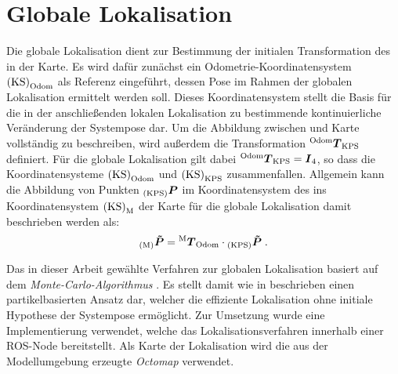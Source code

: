 
\section{Globale Lokalisation}
\label{chap.globloc}
Die globale Lokalisation dient zur Bestimmung der initialen Transformation des  in der Karte. Es wird dafür zunächst ein Odometrie-Koordinatensystem ${\mathrm{(KS)}}_{\mathrm{Odom}}$ als Referenz eingeführt, dessen Pose im Rahmen der globalen Lokalisation ermittelt werden soll. Dieses Koordinatensystem stellt die Basis für die in der anschließenden lokalen Lokalisation zu bestimmende kontinuierliche Veränderung der Systempose dar. Um die Abbildung zwischen \kps{} und Karte vollständig zu beschreiben, wird außerdem die Transformation ${^{\mathrm{Odom}}\mbox{\boldmath{$T$}}_{\mathrm{KPS}}}$ definiert. Für die globale Lokalisation gilt dabei ${^{\mathrm{Odom}}\mbox{\boldmath{$T$}}_{\mathrm{KPS}}} = \mbox{\boldmath{$I$}}_{\mathrm{4}}$, so dass die Koordinatensysteme ${\mathrm{(KS)}}_{\mathrm{Odom}}$ und ${\mathrm{(KS)}}_{\mathrm{KPS}}$ zusammenfallen. Allgemein kann die Abbildung von Punkten ${_{{\mathrm{(KPS)}}}}\mbox{\boldmath{$P$}}$ im Koordinatensystem des  ins Koordinatensystem ${\mathrm{(KS)}}_{\mathrm{M}}$ der Karte für die globale Lokalisation damit beschrieben werden als:
%
\begin{equation}
{_{{\mathrm{(M)}}}}\mbox{\boldmath{$\tilde{P}$}} = {^{\mathrm{M}}\mbox{\boldmath{$T$}}_{\mathrm{Odom}}} \cdot {_{{\mathrm{(KPS)}}}}\mbox{\boldmath{$\tilde{P}$}} \; \text{.}
\label{eq.globloc}
\end{equation}

\prever{
}

Das in dieser Arbeit gewählte Verfahren zur globalen Lokalisation basiert auf dem \textit{Monte-Carlo-Algorithmus} \cite{Dellaert1999}. Es stellt damit wie in  beschrieben einen partikelbasierten Ansatz dar, welcher die effiziente Lokalisation ohne initiale Hypothese der Systempose ermöglicht. Zur Umsetzung wurde eine Implementierung \cite{humanoidNavigation} verwendet, welche das Lokalisationsverfahren innerhalb einer ROS-Node bereitstellt. Als Karte der Lokalisation wird die aus der Modellumgebung erzeugte \textit{Octomap} verwendet.\\

\prever{
}

